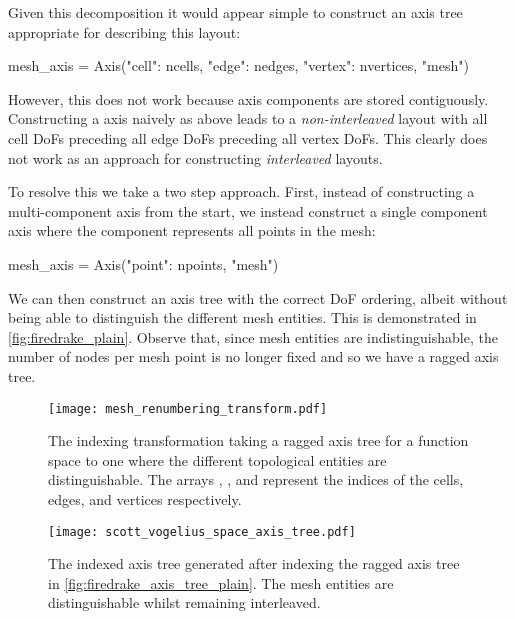 \documentclass[thesis]{subfiles}
\begin{document}
Given this decomposition it would appear simple to construct an axis tree appropriate for describing this layout:
\begin{pyinline}
  mesh_axis = Axis({"cell": ncells,
                    "edge": nedges,
                    "vertex": nvertices}, "mesh")
\end{pyinline}
However, this does not work because axis components are stored contiguously.
Constructing a  axis naively as above leads to a \emph{non-interleaved} layout with all cell DoFs preceding all edge DoFs preceding all vertex DoFs.
This clearly does not work as an approach for constructing \emph{interleaved} layouts.

To resolve this we take a two step approach.
First, instead of constructing a multi-component  axis from the start, we instead construct a single component axis where the component represents all points in the mesh:
\begin{pyinline}
  mesh_axis = Axis({"point": npoints}, "mesh")
\end{pyinline}
We can then construct an axis tree with the correct DoF ordering, albeit without being able to distinguish the different mesh entities.
This is demonstrated in \cref{fig:firedrake_plain}.
Observe that, since mesh entities are indistinguishable, the number of nodes per mesh point is no longer fixed and so we have a ragged axis tree.

\begin{landscape}

\begin{figure}
  \centering
  \texttt{[image: mesh\_renumbering\_transform.pdf]}
  \caption{
    The indexing transformation taking a ragged axis tree for a function space to one where the different topological entities are distinguishable.
    The arrays \pycode{[0,3,...]}, \pycode{[2,...]}, and \pycode{[1,4,...]} represent the indices of the cells, edges, and vertices respectively.
  }
  \label{fig:mesh_renumbering_transform}
\end{figure}

\begin{figure}
  \centering
  \texttt{[image: scott\_vogelius\_space\_axis\_tree.pdf]}
  \caption{
    The indexed axis tree generated after indexing the ragged axis tree in \cref{fig:firedrake_axis_tree_plain}.
    The mesh entities are distinguishable whilst remaining interleaved.
  }
  \label{fig:firedrake_axis_tree}
\end{figure}

\end{landscape}
\end{document}
